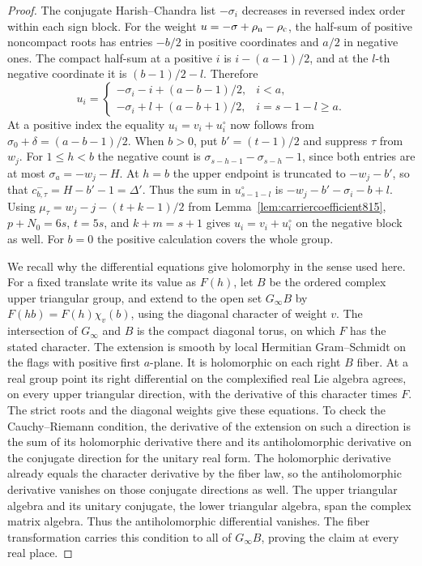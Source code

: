 \documentclass[a4paper,11pt]{article}
\theoremstyle{definition}
\theoremstyle{remark}
\numberwithin{equation}{section}
\begin{document}
\begin{proof}
The conjugate Harish--Chandra list \(-\sigma_i\)
decreases in reversed index order within each sign block.
For the weight \(u=-\sigma+\rho_{\rm n}-\rho_{\rm c}\),
the half-sum of positive noncompact roots has entries
\(-b/2\) in positive coordinates and \(a/2\) in negative
ones. The compact half-sum at a positive \(i\) is
\(i-(a-1)/2\), and at the \(l\)-th negative coordinate it
is \((b-1)/2-l\). Therefore
\[
 u_i=
 \begin{cases}
   -\sigma_i-i+(a-b-1)/2,&i<a,\\
   -\sigma_i+l+(a-b+1)/2,&i=s-1-l\ge a .
 \end{cases}
\]
At a positive index the equality \(u_i=v_i+u^\circ_i\)
now follows from \(\sigma_0+\delta=(a-b-1)/2\).
When \(b>0\), put \(b'=(t-1)/2\) and suppress \(\tau\)
from \(w_j\). For \(1\le h<b\) the negative count is
\(\sigma_{s-h-1}-\sigma_{s-h}-1\), since both entries
are at most \(\sigma_a=-w_j-H\). At \(h=b\) the upper
endpoint is truncated to \(-w_j-b'\), so that
\(c^-_{b,\tau}=H-b'-1=\Delta'\). Thus the sum in
\(u^\circ_{s-1-l}\) is \(-w_j-b'-\sigma_i-b+l\).
Using \(\mu_\tau=w_j-j-(t+k-1)/2\) from
Lemma~\ref{lem:carriercoefficient815}, \(p+N_0=6s\),
\(t=5s\), and \(k+m=s+1\) gives \(u_i=v_i+u^\circ_i\)
on the negative block as well. For \(b=0\) the positive
calculation covers the whole group.

We recall why the differential equations give holomorphy
in the sense used here. For a fixed translate write its
value as \(F(h)\), let \(B\) be the ordered complex upper
triangular group, and extend to the open set \(G_\infty B\)
by \(F(hb)=F(h)\chi_v(b)\), using the diagonal character
of weight \(v\). The intersection of \(G_\infty\) and
\(B\) is the compact diagonal torus, on which \(F\)
has the stated character. The extension is smooth by
local Hermitian Gram--Schmidt on the flags with positive
first \(a\)-plane. It is holomorphic on each right \(B\)
fiber. At a real group point its right differential on
the complexified real Lie algebra agrees, on every upper
triangular direction, with the derivative of this character
times \(F\). The strict roots and the diagonal weights give
these equations. To check the Cauchy--Riemann condition,
the derivative of the extension on such a direction is
the sum of its holomorphic derivative there and its
antiholomorphic derivative on the conjugate direction
for the unitary real form. The holomorphic derivative
already equals the character derivative by the fiber law,
so the antiholomorphic derivative vanishes on those
conjugate directions as well. The upper triangular algebra
and its unitary conjugate, the lower triangular algebra,
span the complex matrix algebra. Thus the antiholomorphic
differential vanishes. The fiber transformation carries
this condition to all of \(G_\infty B\), proving the claim
at every real place.
\end{proof}
\clearpage
\end{document}

